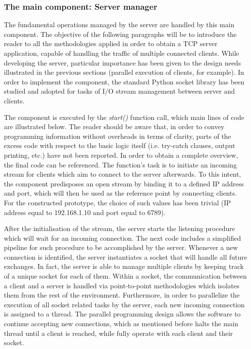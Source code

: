 \vspace{0.5cm}

\vspace{0.5cm}

\vspace{0.5cm}

\newpage
\subsubsection{The main component: Server manager}
The fundamental operations managed by the server are handled by this main component. The objective of the following paragraphs will be to introduce the reader to all the methodologies applied in order to obtain a TCP server application, capable of handling the traffic of multiple connected clients. While developing the server, particular importance has been given to the design needs illustrated in the previous sections (parallel execution of clients, for example). In order to implement the component, the standard Python socket library has been studied and adopted for tasks of I/O stream management between server and clients.

\medskip
The component is executed by the \textit{start()} function call, which main lines of code are illustrated below. The reader should be aware that, in order to convey programming information without overheads in terms of clarity, parts of the excess code with respect to the basic logic itself (i.e. try-catch clauses, output printing, etc.) have not been reported. In order to obtain a complete overview, the final code can be referenced. The function's task is to initiate an incoming stream for clients which aim to connect to the server afterwards. To this intent, the component predisposes an open stream by binding it to a defined IP address and port, which will then be used as the reference point by connecting clients. For the constructed prototype, the choice of such values has been trivial (IP address equal to 192.168.1.10 and port equal to 6789).

\vspace{0.5cm}

\vspace{0.5cm}

After the initialisation of the stream, the server starts the listening procedure which will wait for an incoming connection. The next code includes a simplified pipeline for such procedure to be accomplished by the server. Whenever a new connection is identified, the server instantiates a socket that will handle all future exchanges. In fact, the server is able to manage multiple clients by keeping track of a unique socket for each of them. Within a socket, the communication between a client and a server is handled via point-to-point methodologies which isolates them from the rest of the environment. Furthermore, in order to parallelize the execution of all socket related tasks by the server, each new incoming connection is assigned to a thread. The parallel programming design allows the software to continue accepting new connections, which as mentioned before halts the main thread until a client is reached, while fully operate with each client and their socket.

